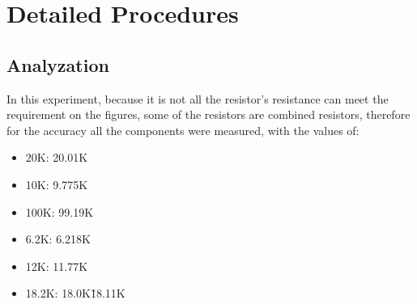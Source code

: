 \section{Detailed Procedures}
    \subsection{Analyzation}
    In this experiment, because it is not all the resistor's resistance can meet the requirement on the figures, some of the resistors are combined resistors, therefore for the accuracy all the components were measured, with the values of:
    \begin{itemize}
        \item 20K: 20.01K
        \item 10K: 9.775K
        \item 100K: 99.19K
        \item 6.2K: 6.218K
        \item 12K: 11.77K
        \item 18.2K: 18.0K\~18.11K
    \end{itemize}
